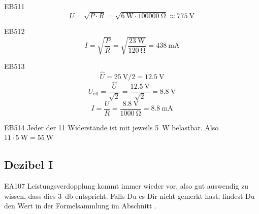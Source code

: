 \begin{sol}{EB511}  
$$U = \sqrt{P\cdot R} = \sqrt{\SI{6}{\watt}\cdot \SI{100000}{\ohm}}  \approx \SI{775}{\volt}$$
\end{sol} 

\begin{sol}{EB512}      
$$I = \sqrt{\frac{P}{R}} = \sqrt{\frac{\SI{23}{\watt}}{\SI{120}{\ohm}}}  = \SI{438}{\milli\ampere}$$
\end{sol} 


\begin{sol}{EB513}  
    $$\hat{U} = \SI{25}{\volt} / 2 = \SI{12.5}{\volt} $$
    $$U_\text{eff} = \frac{\hat{U}}{\sqrt{2}} = \frac{\SI{12.5}{\volt}}{\sqrt{2}}  = \SI{8.8}{\volt}$$
$$I = \frac{U}{R} = \frac{ \SI{8.8}{\volt}}{\SI{1000}{\ohm}}= \SI{8.8}{\milli\ampere}$$
\end{sol} 

\begin{sol}{EB514}  
 Jeder der 11 Widerstände ist mit jeweils \SI{5}{\watt} belastbar. Also $11\cdot \SI{5}{\watt} = \SI{55}{\watt}$
\end{sol} 

\begin{ohmchapter}    
\end{ohmchapter}  

\subsection{Dezibel I}

  \begin{sol}{EA107}    
    Leistungsverdopplung kommt immer wieder vor, also gut auswendig zu wissen, dass dies \SI{3}{\decibel} entspricht. Falls Du es Dir nicht gemerkt hast, findest Du den Wert in der Formelsammlung im Abschnitt .
 \end{sol}
\begin{ohmchapter}
\end{ohmchapter}  